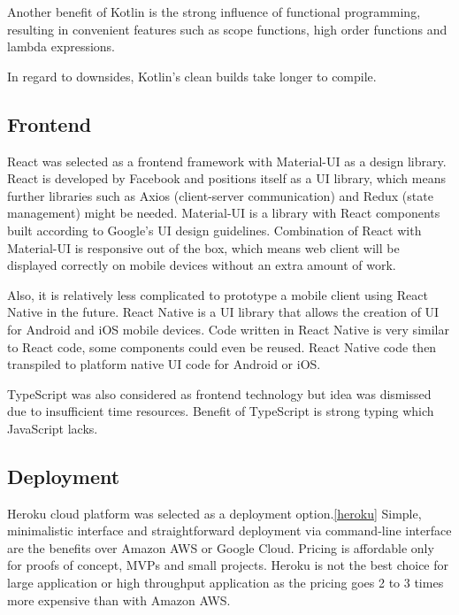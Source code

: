 Another benefit of Kotlin is the strong influence of functional programming,
resulting in convenient features such as scope functions, high order functions and lambda expressions.

In regard to downsides, Kotlin's clean builds take longer to compile.\cite{kotlin-compile}

\subsection{Frontend}\label{subsec:ts-frontend}

React was selected as a frontend framework with Material-UI as a design library.\cite{react, material}
React is developed by Facebook and positions itself as a UI library, which means further libraries
such as Axios (client-server communication) and Redux (state management) might be needed.\cite{axios, redux}
Material-UI is a library with React components built according to Google's UI design guidelines.
Combination of React with Material-UI is responsive out of the box, which means web client will be displayed
correctly on mobile devices without an extra amount of work.

Also, it is relatively less complicated to prototype a mobile client using React Native in the future.\cite{react-native}
React Native is a UI library that allows the creation of UI for Android and iOS mobile devices.
Code written in React Native is very similar to React code, some components could even be reused.
React Native code then transpiled to platform native UI code for Android or iOS\@.

TypeScript was also considered as frontend technology but idea was dismissed due to insufficient time resources.
Benefit of TypeScript is strong typing which JavaScript lacks.\cite{typescript}

\subsection{Deployment}\label{subsec:ts-deployment}

Heroku cloud platform was selected as a deployment option.\ref{heroku}
Simple, minimalistic interface and straightforward deployment via command-line interface are the benefits over Amazon AWS or Google Cloud.
Pricing is affordable only for proofs of concept, MVPs and small projects.
Heroku is not the best choice for large application or high throughput application as the pricing goes 2 to 3
times more expensive than with Amazon AWS.\cite{heroku-vs-aws}
